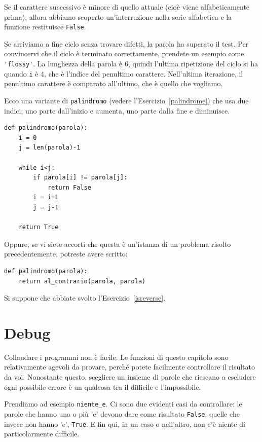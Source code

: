 \documentclass[10pt]{book}
\begin{document}
Se il carattere successivo è minore di quello attuale (cioè viene alfabeticamente prima), allora abbiamo scoperto un'interruzione nella serie alfabetica e la funzione restituisce {\tt False}.

Se arriviamo a fine ciclo senza trovare difetti, la parola ha superato il test. Per convincervi che il ciclo è terminato correttamente, prendete un esempio come \verb"'flossy'".  La lunghezza della parola è 6, quindi l'ultima ripetizione del ciclo si ha quando {\tt i} è 4, che è l'indice del penultimo carattere. Nell'ultima iterazione, il penultimo carattere è comparato all'ultimo, che è quello che vogliamo.

Ecco una variante di \verb"palindromo" (vedere l'Esercizio~\ref{palindrome}) che usa due indici; uno parte dall'inizio e aumenta, uno parte dalla fine e diminuisce.

\begin{verbatim}
def palindromo(parola):
    i = 0
    j = len(parola)-1

    while i<j:
        if parola[i] != parola[j]:
            return False
        i = i+1
        j = j-1

    return True
\end{verbatim}

Oppure, se vi siete accorti che questa è un'istanza di un problema risolto precedentemente, potreste avere scritto:

\begin{verbatim}
def palindromo(parola):
    return al_contrario(parola, parola)
\end{verbatim}

Si suppone che abbiate svolto l'Esercizio~\ref{isreverse}.


\section{Debug}

Collaudare i programmi non è facile. Le funzioni di questo capitolo sono relativamente agevoli da provare, perché potete facilmente controllare il risultato da voi. Nonostante questo, scegliere un insieme di parole che riescano a escludere ogni possibile errore è un qualcosa tra il difficile e l'impossibile.

Prendiamo ad esempio \verb"niente_e". Ci sono due evidenti casi da controllare: le parole che hanno una o più 'e' devono dare come risultato {\tt False};
quelle che invece non hanno 'e', {\tt True}. E fin qui, in un caso o nell'altro, non c'è niente di particolarmente difficile.
\end{document}
